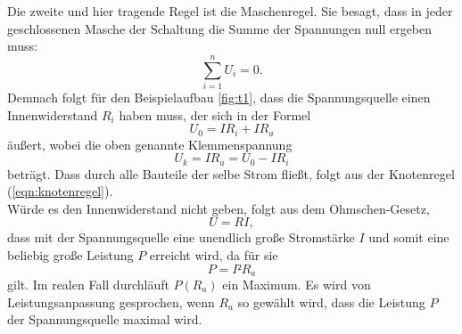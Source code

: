 Die zweite und hier tragende Regel ist die Maschenregel.
Sie besagt, dass in jeder geschlossenen Masche der Schaltung die Summe der Spannungen null ergeben muss:
\begin{equation}
  \sum_{i=1}^n U_i = 0.
  \label{eqn:maschenregel}
\end{equation}
Demnach folgt für den Beispielaufbau \ref{fig:t1}, dass die Spannungsquelle einen Innenwiderstand $R_i$ haben muss, der sich in der Formel
\begin{equation}
  U_0 = IR_i + IR_a
\end{equation}
äußert, wobei die oben genannte Klemmenspannung
\begin{equation}
  U_k = IR_a = U_0 - IR_i
  \label{eqn:klemmspannung}
\end{equation}
beträgt.
Dass durch alle Bauteile der selbe Strom fließt, folgt aus der Knotenregel (\ref{eqn:knotenregel}).\\
Würde es den Innenwiderstand nicht geben, folgt aus dem Ohmschen-Gesetz,
\begin{equation}
  U = RI,
\end{equation}
dass mit der Spannungsquelle eine unendlich große Stromstärke $I$ und somit eine beliebig große Leistung $P$ erreicht wird, da für sie
\begin{equation}
  P = I²R_a
  \label{eqn:leistung}
\end{equation}
gilt.
Im realen Fall durchläuft $P(R_a)$ ein Maximum.
Es wird von Leistungsanpassung gesprochen, wenn $R_a$ so gewählt wird, dass die Leistung $P$ der Spannungsquelle maximal wird.
